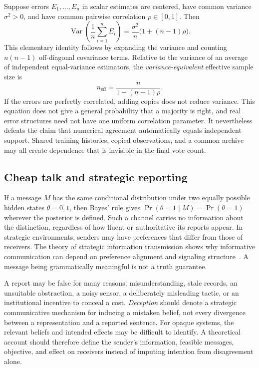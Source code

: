 \documentclass[11pt,letterpaper]{article}
\theoremstyle{plain}
\theoremstyle{definition}
\theoremstyle{remark}
\begin{document}
Suppose errors $E_1,\ldots,E_n$ in scalar estimates are centered, have common variance $\sigma^2>0$, and have common pairwise correlation $\rho\in[0,1]$. Then
\begin{equation}\label{eq:correlated}
\operatorname{Var}\left(\frac1n\sum_{i=1}^n E_i\right)
=\frac{\sigma^2}{n}\bigl(1+(n-1)\rho\bigr).
\end{equation}
This elementary identity follows by expanding the variance and counting $n(n-1)$ off-diagonal covariance terms. Relative to the variance of an average of independent equal-variance estimators, the \emph{variance-equivalent} effective sample size is
\[
n_{\mathrm{eff}}=\frac{n}{1+(n-1)\rho}.
\]
If the errors are perfectly correlated, adding copies does not reduce variance. This equation does not give a general probability that a majority is right, and real error structures need not have one uniform correlation parameter. It nevertheless defeats the claim that numerical agreement automatically equals independent support. Shared training histories, copied observations, and a common archive may all create dependence that is invisible in the final vote count.

\subsection{Cheap talk and strategic reporting}

If a message $M$ has the same conditional distribution under two equally possible hidden states $\theta=0,1$, then Bayes' rule gives $\Pr(\theta=1\mid M)=\Pr(\theta=1)$ wherever the posterior is defined. Such a channel carries no information about the distinction, regardless of how fluent or authoritative its reports appear. In strategic environments, senders may have preferences that differ from those of receivers. The theory of strategic information transmission shows why informative communication can depend on preference alignment and signaling structure~\cite{crawfordsobel}. A message being grammatically meaningful is not a truth guarantee.

A report may be false for many reasons: misunderstanding, stale records, an unsuitable abstraction, a noisy sensor, a deliberately misleading tactic, or an institutional incentive to conceal a cost. \emph{Deception} should denote a strategic communicative mechanism for inducing a mistaken belief, not every divergence between a representation and a reported sentence. For opaque systems, the relevant beliefs and intended effects may be difficult to identify. A theoretical account should therefore define the sender's information, feasible messages, objective, and effect on receivers instead of imputing intention from disagreement alone.
\end{document}
